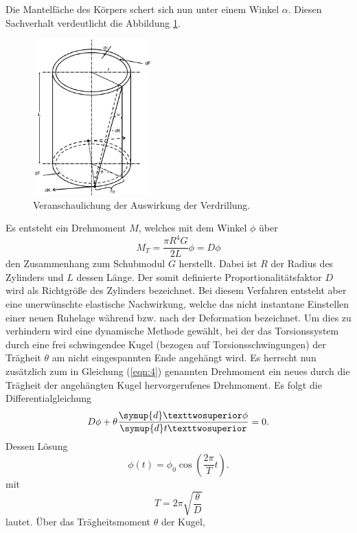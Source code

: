 Die Mantelfäche des Körpers schert sich nun unter einem Winkel $\alpha$. Diesen Sachverhalt verdeutlicht die Abbildung \ref{fig:3}.
\begin{figure}[H]
  \centering
  \includegraphics[height=6cm]{scherung3.png}
  \caption{Veranschaulichung der Auswirkung der Verdrillung. \cite{sample}}
  \label{fig:3}
\end{figure}
Es entsteht ein Drehmoment $M$, welches mit dem Winkel $\phi$ über
\begin{equation}
  M_T = \frac{\pi R^4 G}{2L} \phi = D \phi \label{eqn:4}
\end{equation}
den Zusammenhang zum Schubmodul $G$ herstellt.
Dabei ist $R$ der Radius des Zylinders und $L$ dessen Länge.
Der somit definierte Proportionalitätsfaktor $D$ wird als Richtgröße des Zylinders bezeichnet.
Bei diesem Verfahren entsteht aber eine unerwünschte elastische Nachwirkung, welche das nicht instantane Einstellen einer neuen Ruhelage während bzw. nach der Deformation bezeichnet.
Um dies zu verhindern wird eine dynamische Methode gewählt, bei der das Torsionssystem durch eine frei schwingendee Kugel (bezogen auf Torsionsschwingungen) der Trägheit $\theta$ am nicht eingespannten Ende angehängt wird.
Es herrscht nun zusätzlich zum in Gleichung (\ref{eqn:4}) genannten Drehmoment ein neues durch die Trägheit der angehängten Kugel hervorgerufenes Drehmoment.
Es folgt die Differentialgleichung
\begin{equation}
  D \phi + \theta \frac{\symup{d}²\phi}{\symup{d}t²} = 0. \label{eqn1:1}
\end{equation}
Dessen Lösung
\begin{equation}
  \phi (t) = \phi_0\cos\left(\frac{2\pi}{T}t\right). \label{eqn:5}
\end{equation}
mit
\begin{equation}
  T = 2\pi\sqrt{\frac{\theta}{D}} \label{eqn:6}
\end{equation}
lautet.
Über das Trägheitsmoment $\theta$ der Kugel,
